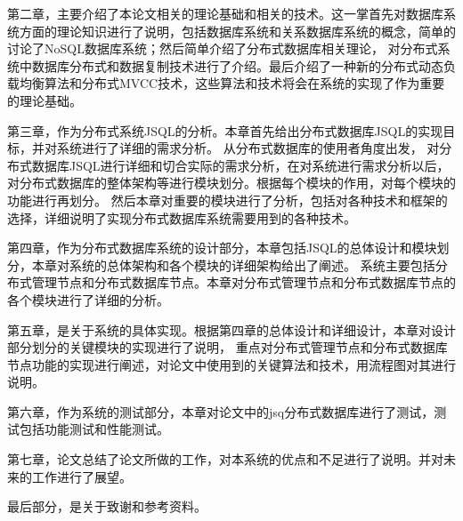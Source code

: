 第二章，主要介绍了本论文相关的理论基础和相关的技术。这一掌首先对数据库系统方面的理论知识进行了说明，包括数据库系统和关系数据库系统的概念，简单的讨论了NoSQL数据库系统；然后简单介绍了分布式数据库相关理论，
对分布式系统中数据库分布式和数据复制技术进行了介绍。最后介绍了一种新的分布式动态负载均衡算法和分布式MVCC技术，这些算法和技术将会在系统的实现了作为重要的理论基础。

第三章，作为分布式系统JSQL的分析。本章首先给出分布式数据库JSQL的实现目标，并对系统进行了详细的需求分析。
从分布式数据库的使用者角度出发，
对分布式数据库JSQL进行详细和切合实际的需求分析，在对系统进行需求分析以后，
对分布式数据库的整体架构等进行模块划分。根据每个模块的作用，对每个模块的功能进行再划分。
然后本章对重要的模块进行了分析，包括对各种技术和框架的选择，详细说明了实现分布式数据库系统需要用到的各种技术。

第四章，作为分布式数据库系统的设计部分，本章包括JSQL的总体设计和模块划分，本章对系统的总体架构和各个模块的详细架构给出了阐述。
系统主要包括分布式管理节点和分布式数据库节点。本章对分布式管理节点和分布式数据库节点的各个模块进行了详细的分析。

第五章，是关于系统的具体实现。根据第四章的总体设计和详细设计，本章对设计部分划分的关键模块的实现进行了说明，
重点对分布式管理节点和分布式数据库节点功能的实现进行阐述，对论文中使用到的关键算法和技术，用流程图对其进行说明。

第六章，作为系统的测试部分，本章对论文中的jsq分布式数据库进行了测试，测试包括功能测试和性能测试。

第七章，论文总结了论文所做的工作，对本系统的优点和不足进行了说明。并对未来的工作进行了展望。

最后部分，是关于致谢和参考资料。